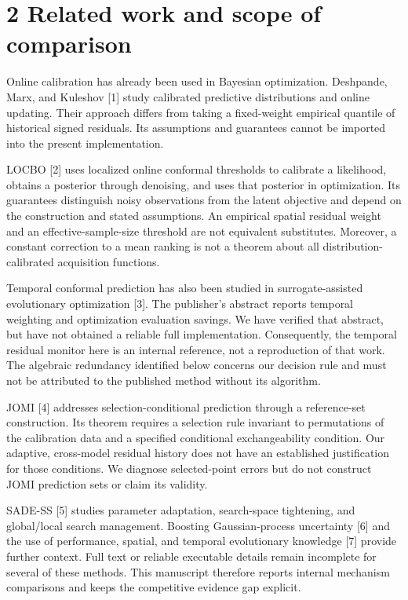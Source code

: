 \documentclass[11pt,a4paper]{article}
\begin{document}
\hypertarget{related-work-and-scope-of-comparison}{%
\section{2 Related work and scope of
comparison}\label{related-work-and-scope-of-comparison}}

Online calibration has already been used in Bayesian optimization.
Deshpande, Marx, and Kuleshov {[}1{]} study calibrated predictive
distributions and online updating. Their approach differs from taking a
fixed-weight empirical quantile of historical signed residuals. Its
assumptions and guarantees cannot be imported into the present
implementation.

LOCBO {[}2{]} uses localized online conformal thresholds to calibrate a
likelihood, obtains a posterior through denoising, and uses that
posterior in optimization. Its guarantees distinguish noisy observations
from the latent objective and depend on the construction and stated
assumptions. An empirical spatial residual weight and an
effective-sample-size threshold are not equivalent substitutes.
Moreover, a constant correction to a mean ranking is not a theorem about
all distribution-calibrated acquisition functions.

Temporal conformal prediction has also been studied in
surrogate-assisted evolutionary optimization {[}3{]}. The publisher's
abstract reports temporal weighting and optimization evaluation savings.
We have verified that abstract, but have not obtained a reliable full
implementation. Consequently, the temporal residual monitor here is an
internal reference, not a reproduction of that work. The algebraic
redundancy identified below concerns our decision rule and must not be
attributed to the published method without its algorithm.

JOMI {[}4{]} addresses selection-conditional prediction through a
reference-set construction. Its theorem requires a selection rule
invariant to permutations of the calibration data and a specified
conditional exchangeability condition. Our adaptive, cross-model
residual history does not have an established justification for those
conditions. We diagnose selected-point errors but do not construct JOMI
prediction sets or claim its validity.

SADE-SS {[}5{]} studies parameter adaptation, search-space tightening,
and global/local search management. Boosting Gaussian-process
uncertainty {[}6{]} and the use of performance, spatial, and temporal
evolutionary knowledge {[}7{]} provide further context. Full text or
reliable executable details remain incomplete for several of these
methods. This manuscript therefore reports internal mechanism
comparisons and keeps the competitive evidence gap explicit.
\end{document}
